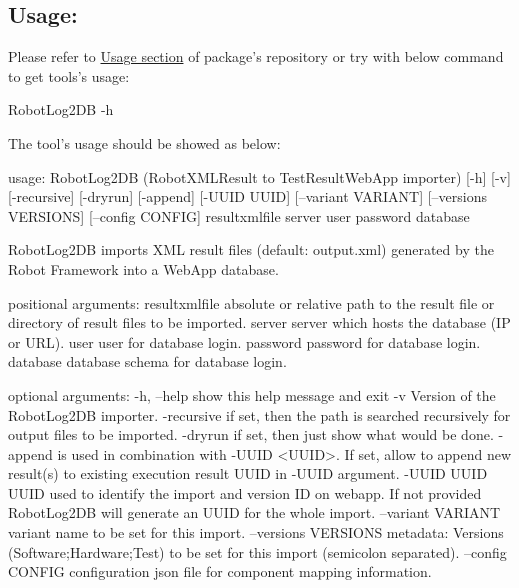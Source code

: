 \subsection{Usage:}
Please refer to \href{https://github.com/test-fullautomation/robotframework-robotlog2db#usage}{Usage section}
of package's repository or try with below command to get tools's usage:
\begin{robotlog}
RobotLog2DB -h
\end{robotlog}

The tool's usage should be showed as below:
\begin{robotlog}
usage: RobotLog2DB (RobotXMLResult to TestResultWebApp importer) [-h] [-v] 
                     [-recursive] [-dryrun] [-append] [-UUID UUID] 
                     [--variant VARIANT] [--versions VERSIONS] [--config CONFIG]
                     resultxmlfile server user password database

RobotLog2DB imports XML result files (default: output.xml) generated by the 
                     Robot Framework into a WebApp database.

positional arguments:
resultxmlfile        absolute or relative path to the result file or directory 
                     of result files to be imported.
server               server which hosts the database (IP or URL).
user                 user for database login.
password             password for database login.
database             database schema for database login.

optional arguments:
-h, --help           show this help message and exit
-v                   Version of the RobotLog2DB importer.
-recursive           if set, then the path is searched recursively for output 
                     files to be imported.
-dryrun              if set, then just show what would be done.
-append              is used in combination with -UUID <UUID>. If set, allow to 
                     append new result(s) to existing execution result UUID in 
                     -UUID argument.
-UUID UUID           UUID used to identify the import and version ID on webapp. 
                     If not provided RobotLog2DB will generate an UUID for the 
                     whole import.
--variant VARIANT    variant name to be set for this import.
--versions VERSIONS  metadata: Versions (Software;Hardware;Test) to be set for 
                     this import (semicolon separated).
--config CONFIG      configuration json file for component mapping information.
\end{robotlog}

